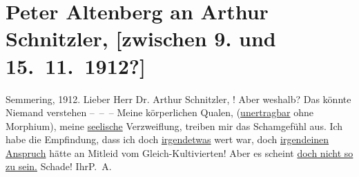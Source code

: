 

         
         \renewcommand{\erwaehntePersonen}{Personen: Hermann Bahr}
         \renewcommand{\erwaehnteOrte}{Orte: Semmering, Wien}
         \renewcommand{\erwaehnteWerke}{}
               \section[Peter Altenberg an Arthur Schnitzler, {[}zwischen 9. und 15. 11. 1912?{]}]{ Peter Altenberg an Arthur Schnitzler, {[}zwischen 9. und
               15. 11. 1912?{]}}\nopagebreak{}\rehead{ }\begin{ledgroupsized}[t]{13cm}\normalsize\beginnumbering \toendnotes[C]{\smallbreak\pagebreak[2]} 
\toendnotes[C]{\smallbreak}\pstart
           \raggedleft{}{\pb}Semmering, 1912.\pend
           \pstart
           Lieber Herr Dr. Arthur Schnitzler, \label{K_L02095_1v}\label{K_L02095_1h}!
               Aber weshalb? Das könnte Niemand verstehen – – – Meine körperlichen Qualen, (\uline{unertragbar} ohne Morphium), meine \uline{seelische} Verzweiflung, treiben mir das Schamgefühl aus. Ich
                  {\pb}habe die Empfindung, dass ich doch \uline{irgendetwas} wert war, doch \uline{irgend}\uline{einen Anspruch} hätte an Mitleid vom
               Gleich-Kultivierten! Aber es scheint \uline{doch nicht so zu
                  sein.}{ }Schade!\pend
           \pstart Ihr\spacefill\mbox{P. A.}\pend{}
         
         \endnumbering{}\end{ledgroupsized}  \newcommand{\dateiname}{L02095}\newcommand{\titel}{Peter Altenberg an Arthur Schnitzler, [zwischen 9. und 15. 11. 1912?]}\newcommand{\editorInnen}{Martin Anton Müller und Gerd-Hermann Susen}
      